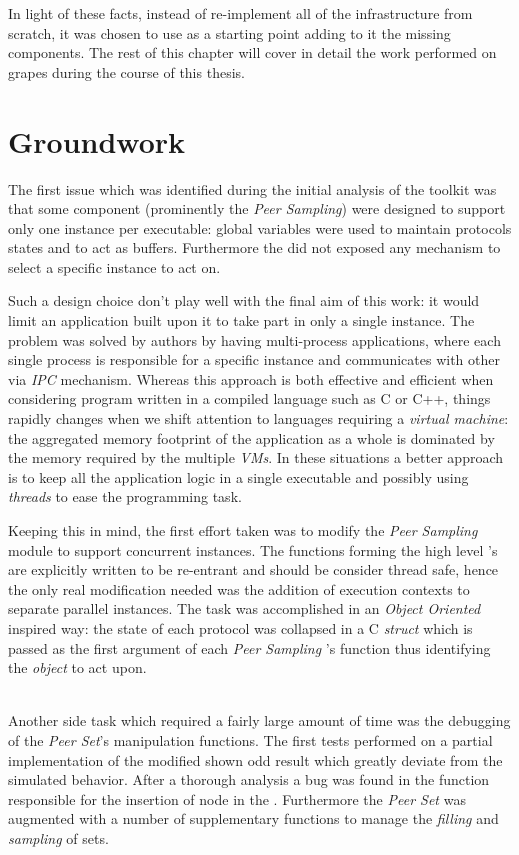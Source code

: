 In light of these facts, instead of re-implement all of the
infrastructure from scratch, it was chosen to use \grapes as a
starting point adding to it the missing components.
The rest of this chapter will cover in detail the work performed on
grapes during the course of this thesis.

\section{Groundwork}
The first issue which was identified during the initial analysis of
the toolkit was that some component (prominently the \textit{Peer
  Sampling}) were designed to support only one instance per
executable: global variables were used to maintain protocols states and
to act as buffers. Furthermore the \api did not exposed any mechanism
to select a specific instance to act on.

Such a design choice don't play well with the final aim of this work: it
would limit an application built upon it to take part in only a single
\peersampling instance. The problem was solved by \grapes authors by
having multi-process applications, where each single process is
responsible for a specific instance and communicates with other
via \emph{IPC} mechanism. Whereas this approach is both effective and
efficient when considering program written in a compiled language
such as C or C++, things rapidly changes when we shift attention to
languages requiring a \emph{virtual machine}: the aggregated memory
footprint of the application as a whole is dominated by the memory
required by the multiple \emph{VMs}. In these situations a better
approach is to keep all the application logic in a single executable
and possibly using \textit{threads} to ease the programming task.

Keeping this in mind, the first effort taken was to modify the
\emph{Peer Sampling} module to support concurrent instances. The
functions forming the high level \grapes's \api are explicitly written
to be re-entrant and should be consider thread safe, hence the only
real modification needed was the addition of execution contexts to
separate parallel instances. The task was accomplished in an
\emph{Object Oriented} inspired way: the state of each protocol was
collapsed in a C \emph{struct} which is passed as the first
argument of each \emph{Peer Sampling} \api's function thus identifying
the \emph{object} to act upon.

\ \\
Another side task which required a fairly large amount of time was the
debugging of the \emph{Peer Set}'s manipulation functions. The
first tests performed on a partial implementation of the modified
\cyclon shown odd result which greatly deviate from the simulated
behavior. After a thorough analysis a bug was found in the function
responsible for the insertion of node \descriptors in the \view.
Furthermore the \emph{Peer Set} \api was augmented with a number of
supplementary functions to manage the \textit{filling} and
\textit{sampling} of sets.

